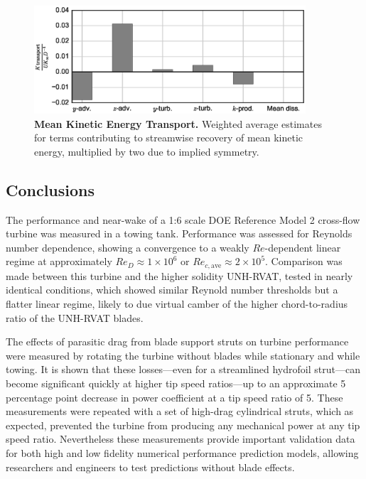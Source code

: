 \documentclass[10pt,letterpaper]{article}
\begin{document}
\begin{figure}[ht!]
    \includegraphics[width=0.9\textwidth]{figures/K_trans_bar_graph.eps}

    \caption{{\bf Mean Kinetic Energy Transport.} Weighted average estimates for
    terms contributing to streamwise recovery of mean kinetic energy, multiplied
    by two due to implied symmetry.}

    \label{fig:Ktransport}
\end{figure}


\subsection*{Conclusions}

The performance and near-wake of a 1:6 scale DOE Reference Model 2 cross-flow
turbine was measured in a towing tank. Performance was assessed for Reynolds
number dependence, showing a convergence to a weakly $Re$-dependent linear
regime at approximately $Re_D \approx 1 \times 10^6$ or $Re_{c,\mathrm{ave}}
\approx 2 \times 10^5$. Comparison was made between this turbine and the higher
solidity UNH-RVAT, tested in nearly identical conditions, which showed similar
Reynold number thresholds but a flatter linear regime, likely to due virtual
camber of the higher chord-to-radius ratio of the UNH-RVAT blades.

The effects of parasitic drag from blade support struts on turbine performance
were measured by rotating the turbine without blades while stationary and while
towing. It is shown that these losses---even for a streamlined hydrofoil
strut---can become significant quickly at higher tip speed ratios---up to an
approximate 5 percentage point decrease in power coefficient at a tip speed
ratio of 5. These measurements were repeated with a set of high-drag cylindrical
struts, which as expected, prevented the turbine from producing any mechanical
power at any tip speed ratio. Nevertheless these measurements provide important
validation data for both high and low fidelity numerical performance prediction
models, allowing researchers and engineers to test predictions without blade
effects.
\end{document}
